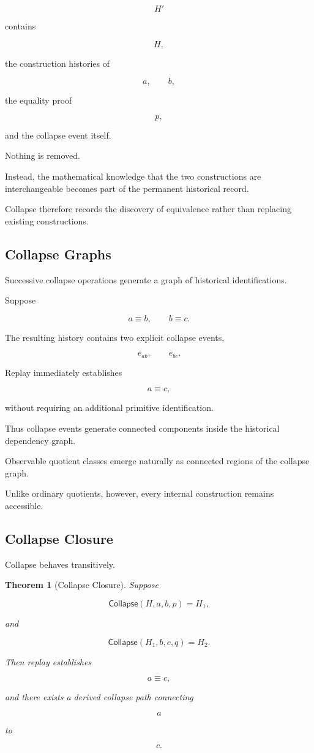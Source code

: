 \documentclass[12pt,oneside]{article}
\newtheorem{theorem}{Theorem}[section]
\theoremstyle{definition}
\theoremstyle{remark}
\newcommand{\Collapse}{\mathsf{Collapse}}
\begin{document}
\[
H'
\]

contains

\[
H,
\]

the construction histories of

\[
a,
\qquad
b,
\]

the equality proof

\[
p,
\]

and the collapse event itself.

Nothing is removed.

Instead, the mathematical knowledge that the two constructions are
interchangeable becomes part of the permanent historical record.

Collapse therefore records the discovery of equivalence rather than replacing
existing constructions.

\subsection{Collapse Graphs}

Successive collapse operations generate a graph of historical identifications.

Suppose

\[
a
\equiv
b,
\qquad
b
\equiv
c.
\]

The resulting history contains two explicit collapse events,

\[
e_{ab},
\qquad
e_{bc}.
\]

Replay immediately establishes

\[
a
\equiv
c,
\]

without requiring an additional primitive identification.

Thus collapse events generate connected components inside the historical
dependency graph.

Observable quotient classes emerge naturally as connected regions of the
collapse graph.

Unlike ordinary quotients, however, every internal construction remains
accessible.

\subsection{Collapse Closure}

Collapse behaves transitively.

\begin{theorem}[Collapse Closure]

Suppose

\[
\Collapse(H,a,b,p)
=
H_1,
\]

and

\[
\Collapse(H_1,b,c,q)
=
H_2.
\]

Then replay establishes

\[
a
\equiv
c,
\]

and there exists a derived collapse path connecting

\[
a
\]

to

\[
c.
\]

\end{theorem}
\end{document}
